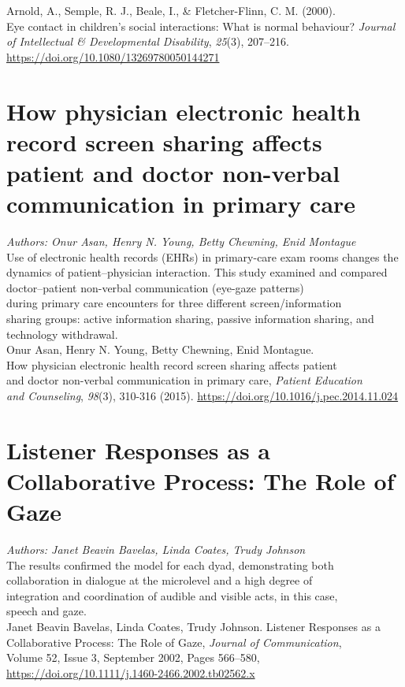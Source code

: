 \documentclass[12pt]{article}
\begin{document}
\noindent Arnold, A., Semple, R. J., Beale, I., \& Fletcher-Flinn, C. M. (2000).\\Eye contact in children’s social interactions: What is normal behaviour? \textit{Journal of Intellectual \& Developmental Disability}, \textit{25}(3), 207–216. \\\href{https://doi.org/10.1080/13269780050144271}{https://doi.org/10.1080/13269780050144271}

\section{How physician electronic health record screen sharing affects patient and doctor non-verbal communication in primary care}

\noindent\textit{Authors: Onur Asan, Henry N. Young, Betty Chewning, Enid Montague}\\

\noindent Use of electronic health records (EHRs) in primary-care exam rooms changes the dynamics of patient–physician interaction. This study examined and compared doctor–patient non-verbal communication (eye-gaze patterns)\\during primary care encounters for three different screen/information\\sharing groups: active information sharing, passive information sharing, and technology withdrawal.\\

\noindent Onur Asan, Henry N. Young, Betty Chewning, Enid Montague.\\How physician electronic health record screen sharing affects patient\\and doctor non-verbal communication in primary care, \textit{Patient Education\\and Counseling}, \textit{98}(3), 310-316 (2015). \href{https://www.sciencedirect.com/science/article/pii/S0738399114004972}{https://doi.org/10.1016/j.pec.2014.11.024}

\section{Listener Responses as a\\Collaborative Process: The Role of Gaze}

\noindent\textit{Authors: Janet Beavin Bavelas, Linda Coates, Trudy Johnson}\\

\noindent The results confirmed the model for each dyad, demonstrating both\\collaboration in dialogue at the microlevel and a high degree of\\integration and coordination of audible and visible acts, in this case,\\speech and gaze.\\

\noindent Janet Beavin Bavelas, Linda Coates, Trudy Johnson. Listener Responses as a Collaborative Process: The Role of Gaze, \textit{Journal of Communication},\\Volume 52, Issue 3, September 2002, Pages 566–580, \\\href{https://doi.org/10.1111/j.1460-2466.2002.tb02562.x}{https://doi.org/10.1111/j.1460-2466.2002.tb02562.x}
\end{document}
